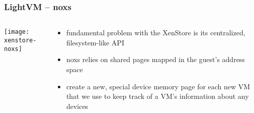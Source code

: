 \begin{frame}[plain]
	\frametitle{LightVM -- noxs}
	
	
	
	\begin{columns}
		
		\begin{column}{.5\textwidth}
		

		\centering
		\texttt{[image: xenstore-noxs]}
			
		\end{column}
		
		\begin{column}{.5\textwidth}

		\begin{itemize}			
			\item fundamental problem with the XenStore is its
			centralized, filesystem-like API
			\item  noxs relies on shared pages mapped in the guest's address space
			\item create a new,
			special device memory page for each new VM that we use
			to keep track of a VM's information about any devices
			
		\end{itemize}
			
			
		\end{column}
		
		
	\end{columns}
	
	
\end{frame}



